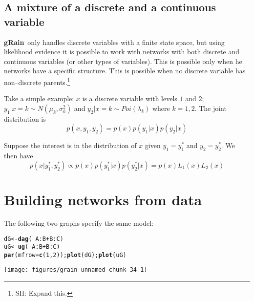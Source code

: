 \documentclass[10pt]{article}\usepackage[]{graphicx}\usepackage[]{color}
\makeatletter
\def\maxwidth{ %
  \ifdim\Gin@nat@width>\linewidth
    \linewidth
  \else
    \Gin@nat@width
  \fi
}
\newcommand{\hlnum}[1]{\textcolor[rgb]{0.686,0.059,0.569}{#1}}%
\newcommand{\hlopt}[1]{\textcolor[rgb]{0,0,0}{#1}}%
\newcommand{\hlstd}[1]{\textcolor[rgb]{0.345,0.345,0.345}{#1}}%
\newcommand{\hlkwb}[1]{\textcolor[rgb]{0.69,0.353,0.396}{#1}}%
\newcommand{\hlkwc}[1]{\textcolor[rgb]{0.333,0.667,0.333}{#1}}%
\newcommand{\hlkwd}[1]{\textcolor[rgb]{0.737,0.353,0.396}{\textbf{#1}}}%
\newenvironment{kframe}{%
 \def\at@end@of@kframe{}%
 \ifinner\ifhmode%
  \def\at@end@of@kframe{\end{minipage}}%
  \begin{minipage}{\columnwidth}%
 \fi\fi%
 \def\FrameCommand##1{\hskip\@totalleftmargin \hskip-\fboxsep
 \colorbox{shadecolor}{##1}\hskip-\fboxsep
     \hskip-\linewidth \hskip-\@totalleftmargin \hskip\columnwidth}%
 \MakeFramed {\advance\hsize-\width
   \@totalleftmargin\z@ \linewidth\hsize
   \@setminipage}}%
 {\par\unskip\endMakeFramed%
 \at@end@of@kframe}
\newenvironment{knitrout}{}{} %
\def\grbn{{\bf gRain}}
\makeatother
\begin{document}
\subsection{A mixture of a discrete and a continuous variable}
\label{sec:ixture}

\grbn\ only handles discrete variables with a finite state space, but
using likelihood evidence it is possible to work with networks with
both discrete and continuous variables (or other types of variables).
This is possible only when he networks
have a specific structure. This is possible when no discrete variable
has non--discrete parents.\footnote{SH: Expand this.}

Take a simple example: $x$ is a discrete variable with levels $1$ and
$2$; $y_1|x=k \sim N(\mu_k, \sigma^2_k)$ and $y_2|x=k \sim
Poi(\lambda_k)$ where $k=1,2$. The joint distribution is
\begin{displaymath}
  p(x,y_1, y_2) = p(x)p(y_1|x)p(y_2|x)
\end{displaymath}

Suppose the interest is in the distribution of $x$ given
$y_1=y_1^*$ and $y_2=y_2^*$. We then have
\begin{displaymath}
  p(x|y_1^*, y_2^*) \propto p(x) p(y_1^*|x)p(y_2^*|x) =
  p(x) L_1(x) L_2(x)
\end{displaymath}







\section{Building networks from data}
\label{sec:using-textttsm-argum}

The following two graphs specify the same model:
\begin{knitrout}
\color{fgcolor}\begin{kframe}
\begin{alltt}
\hlstd{dG}  \hlkwb{<-} \hlkwd{dag}\hlstd{(}\hlopt{~}\hlstd{A}\hlopt{:}\hlstd{B} \hlopt{+} \hlstd{B}\hlopt{:}\hlstd{C)}
\hlstd{uG}  \hlkwb{<-} \hlkwd{ug}\hlstd{(}\hlopt{~}\hlstd{A}\hlopt{:}\hlstd{B} \hlopt{+} \hlstd{B}\hlopt{:}\hlstd{C)}
\hlkwd{par}\hlstd{(}\hlkwc{mfrow}\hlstd{=}\hlkwd{c}\hlstd{(}\hlnum{1}\hlstd{,}\hlnum{2}\hlstd{));} \hlkwd{plot}\hlstd{( dG );} \hlkwd{plot}\hlstd{( uG )}
\end{alltt}
\end{kframe}
\texttt{[image: figures/grain-unnamed-chunk-34-1]} 

\end{knitrout}
\end{document}
